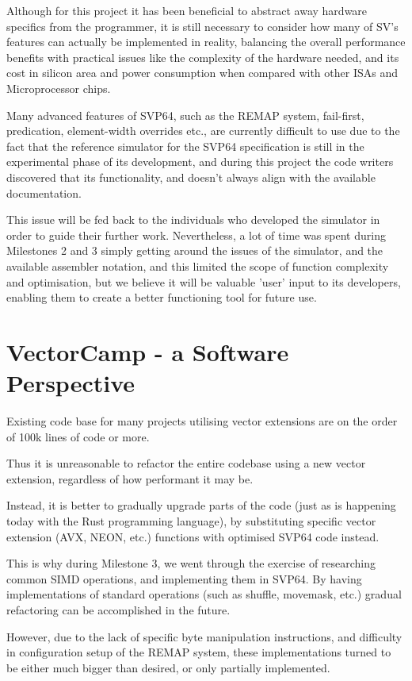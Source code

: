 Although for this project it has been beneficial to abstract away hardware
specifics from the programmer, it is still necessary to consider how many of
\acrshort{SV}'s features can actually be implemented in reality,
balancing the overall performance benefits with practical issues like the
complexity of the hardware needed, and its cost in silicon area and power
consumption when compared with other ISAs and Microprocessor chips.

Many advanced features of SVP64, such as the REMAP system, fail-first,
predication, element-width overrides etc., are currently difficult to use
due to the fact that the reference simulator for the SVP64 specification is
still in the experimental phase of its development, and during this project the
code writers discovered that its functionality, and doesn't always align with
the available documentation.

This issue will be fed back to the individuals who developed the simulator in
order to guide their further work. Nevertheless, a lot of time was spent
during Milestones 2 and 3 simply getting around the issues of the simulator,
and the available assembler notation, and this limited the scope of function
complexity and optimisation, but we believe it will be valuable 'user' input
to its developers, enabling them to create a better functioning tool
for future use.

\section{VectorCamp - a Software Perspective}

Existing code base for many projects utilising vector extensions are on the
order of 100k lines of code or more.

Thus it is unreasonable to refactor the entire codebase using a new vector
extension, regardless of how performant it may be.

Instead, it is better to gradually upgrade parts of the code (just as is
happening today with the Rust programming language), by substituting specific
vector extension (AVX, NEON, etc.) functions with optimised SVP64 code instead.

This is why during Milestone 3, we went through the exercise of researching
common SIMD operations, and implementing them in SVP64. By having
implementations of standard operations (such as shuffle, movemask, etc.)
gradual refactoring can be accomplished in the future.

However, due to the lack of specific byte manipulation instructions, and
difficulty in configuration setup of the REMAP system, these implementations
turned to be either much bigger than desired, or only partially implemented.

